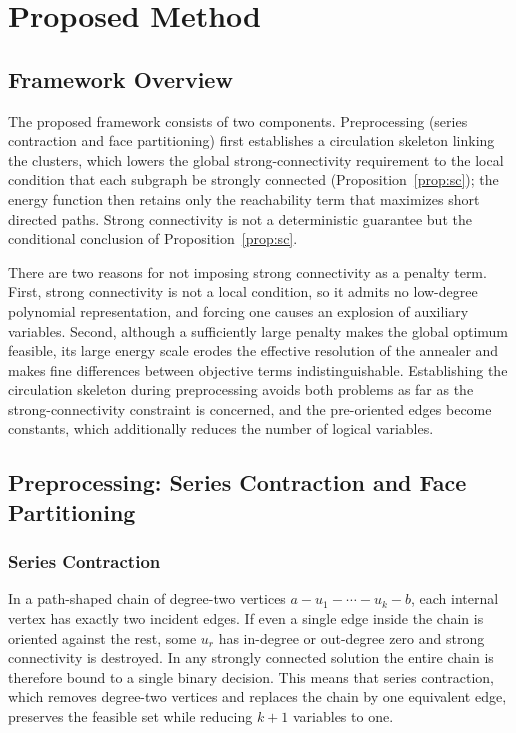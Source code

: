 \documentclass[twocolumn,a4paper]{article}
\begin{document}
\section{Proposed Method} \label{sec:method}

\subsection{Framework Overview}

The proposed framework consists of two components. Preprocessing (series contraction and face partitioning) first establishes a circulation skeleton linking the clusters, which lowers the global strong-connectivity requirement to the local condition that each subgraph be strongly connected (Proposition~\ref{prop:sc}); the energy function then retains only the reachability term that maximizes short directed paths. Strong connectivity is not a deterministic guarantee but the conditional conclusion of Proposition~\ref{prop:sc}.

There are two reasons for not imposing strong connectivity as a penalty term. First, strong connectivity is not a local condition, so it admits no low-degree polynomial representation, and forcing one causes an explosion of auxiliary variables. Second, although a sufficiently large penalty makes the global optimum feasible, its large energy scale erodes the effective resolution of the annealer and makes fine differences between objective terms indistinguishable. Establishing the circulation skeleton during preprocessing avoids both problems as far as the strong-connectivity constraint is concerned, and the pre-oriented edges become constants, which additionally reduces the number of logical variables.

\subsection{Preprocessing: Series Contraction and Face Partitioning} \label{subsec:method_pre}

\subsubsection*{Series Contraction}

In a path-shaped chain of degree-two vertices \(a-u_1-\cdots-u_k-b\), each internal vertex has exactly two incident edges. If even a single edge inside the chain is oriented against the rest, some \(u_r\) has in-degree or out-degree zero and strong connectivity is destroyed. In any strongly connected solution the entire chain is therefore bound to a single binary decision. This means that series contraction, which removes degree-two vertices and replaces the chain by one equivalent edge, preserves the feasible set while reducing \(k+1\) variables to one.
\end{document}
